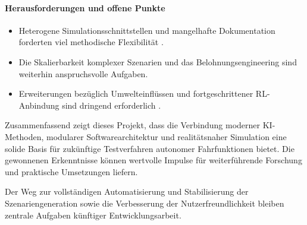 \paragraph{Herausforderungen und offene Punkte}
\begin{itemize}
    \item Heterogene Simulationsschnittstellen und mangelhafte Dokumentation forderten viel methodische Flexibilität \cite{EinfuehrungIntegrationsprojekt}.
    \item Die Skalierbarkeit komplexer Szenarien und das Belohnungsengineering sind weiterhin anspruchsvolle Aufgaben.
    \item Erweiterungen bezüglich Umwelteinflüssen und fortgeschrittener RL-Anbindung sind dringend erforderlich \cite{EinfuehrungIntegrationsprojekt}.
\end{itemize}

Zusammenfassend zeigt dieses Projekt, dass die Verbindung moderner KI-Methoden, modularer Softwarearchitektur und realitätsnaher Simulation eine solide Basis für zukünftige Testverfahren autonomer Fahrfunktionen bietet. Die gewonnenen Erkenntnisse können wertvolle Impulse für weiterführende Forschung und praktische Umsetzungen liefern.

Der Weg zur vollständigen Automatisierung und Stabilisierung der Szenariengeneration sowie die Verbesserung der Nutzerfreundlichkeit bleiben zentrale Aufgaben künftiger Entwicklungsarbeit.
